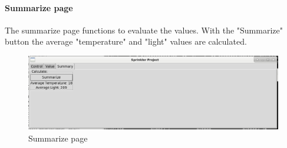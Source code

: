 \documentclass{article}
\begin{document}
\paragraph{Summarize page}
The summarize page functions to evaluate the values. With the "Summarize" button the average "temperature" and "light" values are calculated.
\begin{figure}
\centering
\includegraphics[scale=0.3]{summarize_view.png}
\caption{Summarize page}
\label{fig:summarize}
\end{figure}
\end{document}

